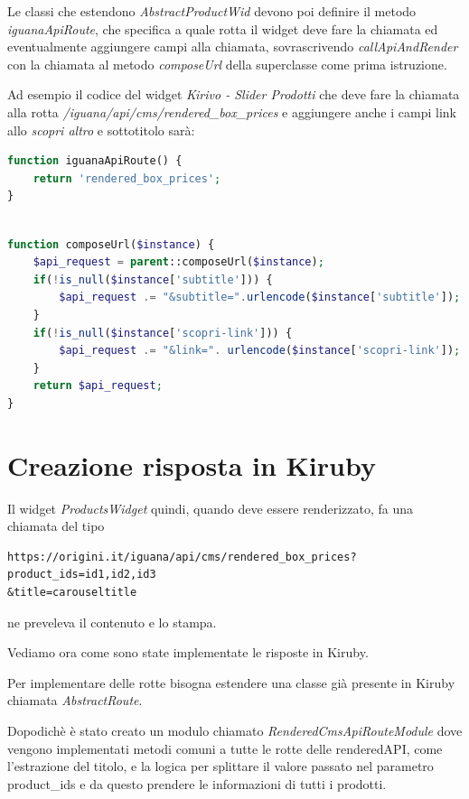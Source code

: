 Le classi che estendono \emph{AbstractProductWid} devono poi definire il metodo \emph{iguanaApiRoute}, che specifica
a quale rotta il widget deve fare la chiamata ed eventualmente aggiungere campi alla chiamata, sovrascrivendo \emph{callApiAndRender} con la 
chiamata al metodo \emph{composeUrl} della superclasse come prima istruzione.

Ad esempio il codice del widget \emph{Kirivo - Slider Prodotti} che deve fare la chiamata alla rotta \emph{/iguana/api/cms/rendered\_box\_prices} e aggiungere  anche i campi link allo \emph{scopri altro} e sottotitolo sarà:

\begin{lstlisting}[style=customphp, language=Php,caption={Viene sovrascritto \emph{iguanaApiRoute} da \emph{ProductsWidget} per specificare la chiamata da effettuare}] 
function iguanaApiRoute() {
    return 'rendered_box_prices';
}
\end{lstlisting}

\begin{lstlisting}[style=customphp, language=Php,caption={Ridefinendo \emph{composeUrl} vengono aggiunti ulteriori campi specifici del widget \emph{ProductsWidget}}] 

function composeUrl($instance) {
    $api_request = parent::composeUrl($instance);
    if(!is_null($instance['subtitle'])) {
        $api_request .= "&subtitle=".urlencode($instance['subtitle']);
    }
    if(!is_null($instance['scopri-link'])) {
        $api_request .= "&link=". urlencode($instance['scopri-link']);
    }
    return $api_request;
}
\end{lstlisting}

\section{Creazione risposta in Kiruby}

Il widget \emph{ProductsWidget} quindi, quando deve essere renderizzato, fa una chiamata del tipo
\begin{verbatim}
https://origini.it/iguana/api/cms/rendered_box_prices?product_ids=id1,id2,id3
&title=carouseltitle
\end{verbatim}
ne preveleva il contenuto e lo stampa.

Vediamo ora come sono state implementate le risposte in Kiruby.

Per implementare delle rotte bisogna estendere una classe già presente in Kiruby chiamata \emph{AbstractRoute}.

Dopodichè è stato creato un modulo chiamato \emph{RenderedCmsApiRouteModule} dove vengono implementati metodi comuni
a tutte le rotte delle renderedAPI, come l'estrazione del titolo, e la logica per splittare il valore passato nel
parametro product\_ids e da questo prendere le informazioni di tutti i prodotti.

